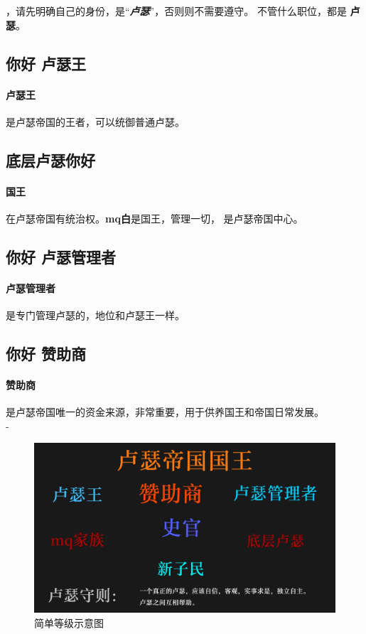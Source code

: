 {，请先明确自己的身份，是“\textit{\textbf{卢瑟}}”，否则则不需要遵守。
不管什么职位，都是 \textbf{卢瑟}。}
\subsection{你好 卢瑟王}
\paragraph{卢瑟王}是卢瑟帝国的王者，可以统御普通卢瑟。
\subsection{底层卢瑟你好}
\paragraph{国王}在卢瑟帝国有统治权。\textbf{mq白}是国王，管理一切， 是卢瑟帝国中心。
\subsection{你好 卢瑟管理者}
\paragraph{卢瑟管理者}是专门管理卢瑟的，地位和卢瑟王一样。

\subsection{你好 赞助商}
\paragraph{赞助商}是卢瑟帝国唯一的资金来源，非常重要，用于供养国王和帝国日常发展。\\
{\color{white}-}

\begin{figure}[H]
    \caption{简单等级示意图} 
    \centering 
    \includegraphics[width = .7\textwidth]{resource/luse.png}
\end{figure}

 